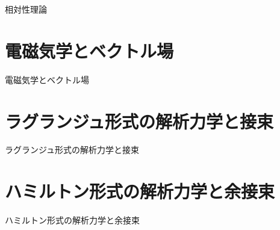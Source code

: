 相対性理論

\newpage


\section{ 電磁気学とベクトル場 }

電磁気学とベクトル場

\newpage


\section{ ラグランジュ形式の解析力学と接束 }

ラグランジュ形式の解析力学と接束

\newpage


\section{ ハミルトン形式の解析力学と余接束 }

ハミルトン形式の解析力学と余接束

\newpage
